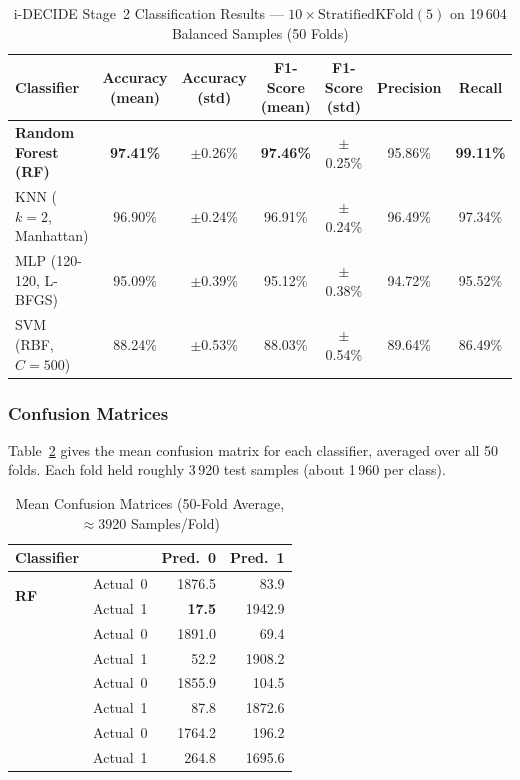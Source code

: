 \documentclass[journal]{IEEEtran}
\begin{document}
\begin{table}[!t]
\caption{i-DECIDE Stage~2 Classification Results ---
$10\times\text{StratifiedKFold}(5)$ on 19\,604 Balanced Samples (50 Folds)}
\label{tab:cls}
\centering
\renewcommand{\arraystretch}{1.2}
\begin{tabular}{lcccccc}
\toprule
\textbf{Classifier} &
  \textbf{Accuracy (mean)} & \textbf{Accuracy (std)} &
  \textbf{F1-Score (mean)} & \textbf{F1-Score (std)} &
  \textbf{Precision} & \textbf{Recall} \\
\midrule
\textbf{Random Forest (RF)}   &
  \textbf{97.41\%} & $\pm$0.26\% &
  \textbf{97.46\%} & $\pm$0.25\% & 95.86\% & \textbf{99.11\%} \\
KNN ($k=2$, Manhattan)         &
  96.90\% & $\pm$0.24\% &
  96.91\% & $\pm$0.24\% & 96.49\% & 97.34\% \\
MLP (120-120, L-BFGS)          &
  95.09\% & $\pm$0.39\% &
  95.12\% & $\pm$0.38\% & 94.72\% & 95.52\% \\
SVM (RBF, $C=500$)             &
  88.24\% & $\pm$0.53\% &
  88.03\% & $\pm$0.54\% & 89.64\% & 86.49\% \\
\bottomrule
\end{tabular}
\end{table}

\subsubsection{Confusion Matrices}

Table~\ref{tab:cm} gives the mean confusion matrix for each classifier,
averaged over all 50 folds. Each fold held roughly 3\,920 test samples
(about 1\,960 per class).

\begin{table}[!t]
\caption{Mean Confusion Matrices (50-Fold Average, $\approx$3920 Samples/Fold)}
\label{tab:cm}
\centering
\renewcommand{\arraystretch}{1.15}
\begin{tabular}{llrr}
\toprule
\textbf{Classifier} & & \textbf{Pred.\ 0} & \textbf{Pred.\ 1} \\
\midrule
\multirow{2}{*}{\textbf{RF}}
  & Actual~0 & 1876.5 &   83.9 \\
  & Actual~1 &   \textbf{17.5} & 1942.9 \\
\addlinespace
\multirow{2}{*}{KNN}
  & Actual~0 & 1891.0 &   69.4 \\
  & Actual~1 &   52.2 & 1908.2 \\
\addlinespace
\multirow{2}{*}{MLP}
  & Actual~0 & 1855.9 &  104.5 \\
  & Actual~1 &   87.8 & 1872.6 \\
\addlinespace
\multirow{2}{*}{SVM}
  & Actual~0 & 1764.2 &  196.2 \\
  & Actual~1 &  264.8 & 1695.6 \\
\bottomrule
\end{tabular}
\end{table}
\end{document}
